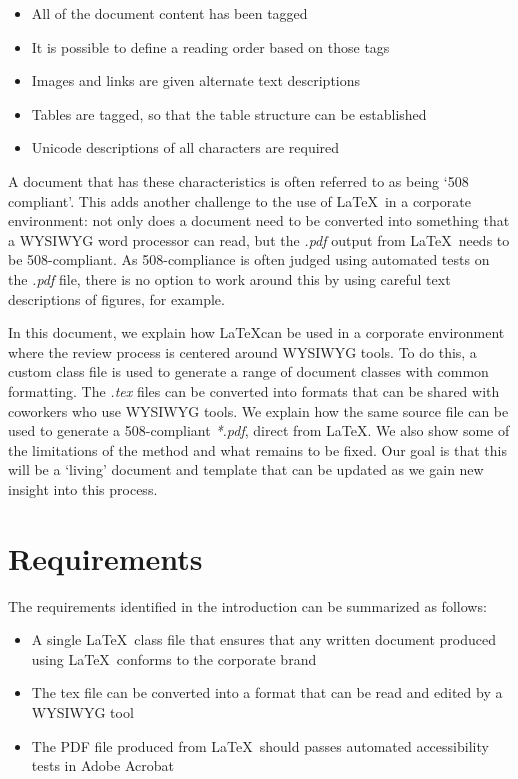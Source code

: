 \documentclass[12pt,letterpaper]{article}
\newcommand{\fn}[1]{\emph{#1}}
\begin{document}
\begin{itemize}
\item All of the document content has been tagged
\item It is possible to define a reading order based on those tags
\item Images and links are given alternate text descriptions
\item Tables are tagged, so that the table structure can be established
\item Unicode descriptions of all characters are required
\end{itemize}

A document that has these characteristics is often referred to as being `508 compliant'. This adds another challenge to the use of \LaTeX\ in a corporate environment: not only does a document need to be converted into something that a WYSIWYG word processor can read, but the \fn{.pdf} output from \LaTeX\ needs to be 508-compliant. As 508-compliance is often judged using automated tests on the \fn{.pdf} file, there is no option to work around this by using careful text descriptions of figures, for example.

In this document, we explain how \LaTeX can be used in a corporate environment where the review process is centered around WYSIWYG tools. To do this, a custom class file is used to generate a range of document classes with common formatting. The \fn{.tex} files can be converted into formats that can be shared with coworkers who use WYSIWYG tools. We explain how the same source file can be used to generate a 508-compliant \fn{*.pdf}, direct from \LaTeX. We also show some of the limitations of the method and what remains to be fixed. Our goal is that this will be a `living' document and template that can be updated as we gain new insight into this process.

\section{Requirements}
The requirements identified in the introduction can be summarized as follows:
\begin{itemize}
\item A single \LaTeX\ class file that ensures that any written document produced using \LaTeX\ conforms to the corporate brand
\item The tex file can be converted into a format that can be read and edited by a WYSIWYG tool
\item The PDF file produced from \LaTeX\ should passes automated accessibility tests in Adobe Acrobat
\end{itemize}
\end{document}
